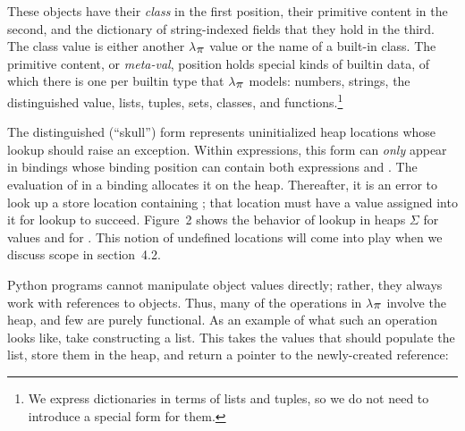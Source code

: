 \documentclass[10pt]{sigplanconf}
\newcommand{\SecRef}[2]{section~#1}
\newcommand{\SecRefLocal}[3]{\SecRef{#2}{#3}}
\newcommand{\textsub}[1]{$_{\hbox{\textsmaller{#1}}}$}
\newcommand{\Larger}[1]{\textlarger{#1}}
\newcommand{\NoteBox}[1]{\footnote{#1}}
\newcommand{\NoteContent}[1]{#1}
\newcommand{\FigureRef}[2]{#1}
\begin{document}
\noindent These objects have their \textit{class} in the first position, their primitive
content in the second, and the dictionary of string{-}indexed fields that they
hold in the third.  The class value is either another $\lambda$\textsub{\Larger{$\pi$}} value or the
name of a built{-}in class.
The primitive content, or \textit{meta{-}val},
position holds special kinds of builtin data, of which
there is one per builtin type that $\lambda$\textsub{\Larger{$\pi$}} models: numbers, strings, the
distinguished  value, lists, tuples, sets, classes, and
functions.\NoteBox{\NoteContent{We express dictionaries in terms of lists and tuples, so we do
not need to introduce a special \raisebox{-3.385156249999999bp}{\makebox[18.57734375bp][l]{\texttt{[image: pict\_10.pdf]}}} form for them.}}

The distinguished  ({``}skull{''}) form represents uninitialized heap
locations whose lookup should raise an exception.  Within
expressions, this form can \textit{only} appear in bindings
whose binding position can contain both expressions and .  The evaluation of  in a binding
allocates it on the heap.  Thereafter, it is an error to look up a
store location containing ; that location must have a
value  assigned into it for lookup to succeed.
Figure~\FigureRef{2}{t:x28counter_x28x22figurex22_x22fx3askullx22x29x29} shows the behavior of lookup in heaps $\Sigma$ for values and
for .  This notion of undefined locations will
come into play when we discuss scope in \SecRefLocal{t:x28part_x22sx3ascopex22x29}{4.2}{Scope}.

Python programs cannot manipulate object values directly; rather, they always
work with references to objects.  Thus, many of the operations in $\lambda$\textsub{\Larger{$\pi$}}
involve the heap, and few are purely functional.  As an example of what such an
operation looks like, take constructing a list. This takes the values
that should populate the list, store them in the heap, and return a
pointer to the newly{-}created reference:
\end{document}
